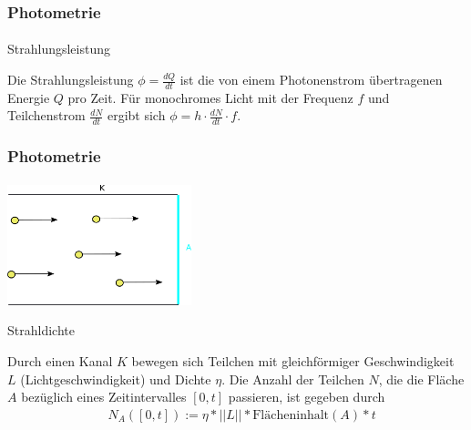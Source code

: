\documentclass{beamer}
\begin{document}
\begin{frame}
    \frametitle{Photometrie}
\framesubtitle{}
\begin{block}{Strahlungsleistung}

Die Strahlungsleistung $\phi = \frac{d Q}{dt}$ ist die von einem Photonenstrom übertragenen Energie $Q$ pro Zeit. 
Für monochromes Licht mit der Frequenz $f$ und Teilchenstrom $ \frac{d N}{dt} $ ergibt sich $\phi = h \cdot  \frac{d N}{dt}  \cdot f$.



\end{block}
\end{frame}


\begin{frame}
    \frametitle{Photometrie}
\framesubtitle{}
\begin{center}
    \includegraphics[width=0.4\textwidth]{images/Partikelstrom.png}
\end{center}
\begin{block}{ Strahldichte}

Durch einen Kanal $K$ bewegen  sich Teilchen mit gleichförmiger Geschwindigkeit $L$ (Lichtgeschwindigkeit)  und  Dichte $\eta$.
Die Anzahl der Teilchen $N$, die die Fläche $A$ bezüglich eines Zeitintervalles $[0,t]$ passieren, ist gegeben durch
\begin{align}
& N_A([0,t]) := \eta * ||L||  *   \text{Flächeninhalt}(A) *   t 
\end{align}
\end{block}
\end{frame}
\end{document}
